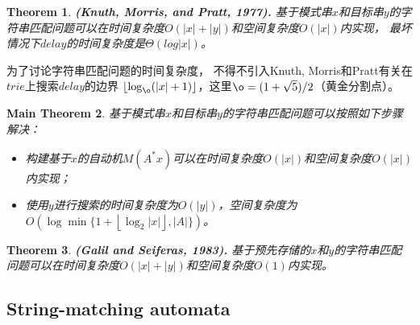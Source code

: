 \documentclass[UTF8]{ctexart}
\newtheorem{thm}{Theorem}[subsection]
\newtheorem{mthm}[thm]{Main Theorem}
\theoremstyle{definition}
\theoremstyle{remark}
\numberwithin{equation}{subsection}
\newcommand{\Emph}{\textbf}
\begin{document}
	\begin{thm}
		\Emph{(Knuth, Morris, and Pratt, 1977).}
		基于模式串$x$和目标串$y$的字符串匹配问题可以在时间复杂度$O(|x|+|y|)$和空间复杂度$O(|x|)$内实现，
		最坏情况下$delay$的时间复杂度是$\Theta(log|x|)$。
	\end{thm}
	为了讨论字符串匹配问题的时间复杂度，
	不得不引入Knuth, Morris和Pratt有关在$trie$上搜索$delay$的边界
	$\left\lfloor \log_{\o}(|x|+1) \right\rfloor$，这里${\o} = (1+\sqrt5)/2$（黄金分割点）。
	
	\begin{mthm}
		基于模式串$x$和目标串$y$的字符串匹配问题可以按照如下步骤解决：
		\begin{itemize}
			\item 构建基于$x$的自动机$M(A^*x)$可以在时间复杂度$O(|x|)$和空间复杂度$O(|x|)$内实现；
			\item 使用$y$进行搜索的时间复杂度为$O(|y|)$，空间复杂度为$O(\log \min \{ 1+\left\lfloor \log_2|x| \right\rfloor, |A| \})$。
		\end{itemize}
	\end{mthm}
	\begin{thm}
		\Emph{(Galil and Seiferas, 1983).}
		基于预先存储的$x$和$y$的字符串匹配问题可以在时间复杂度$O(|x|+|y|)$和空间复杂度$O(1)$内实现。
	\end{thm}
	
\subsection{String-matching automata}
\end{document}
